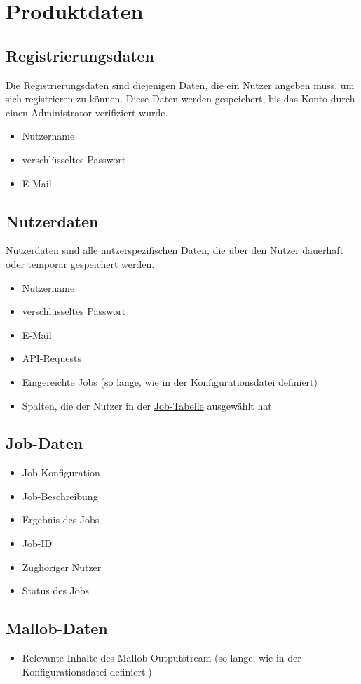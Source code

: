 \label{PD}
\section{Produktdaten}


\label{PD:Registrierungsdaten}
\subsection{Registrierungsdaten}
Die Registrierungsdaten sind diejenigen Daten, die ein Nutzer angeben muss, um sich registrieren zu können. Diese Daten werden gespeichert, bis das Konto durch einen Administrator verifiziert wurde.
\begin{itemize}[noitemsep]
    \item Nutzername
    \item verschlüsseltes Passwort
    \item E-Mail
\end{itemize}

\label{PD:Nutzerdaten}
\subsection{Nutzerdaten}
Nutzerdaten sind alle nutzerspezifischen Daten, die über den Nutzer dauerhaft oder temporär gespeichert werden.
\begin{itemize}[noitemsep]
    \item Nutzername
    \item verschlüsseltes Passwort
    \item E-Mail
    \item API-Requests %
    \item Eingereichte Jobs (so lange, wie in der Konfigurationsdatei definiert)
    \item Spalten, die der Nutzer in der \hyperref[pages:job-table]{Job-Tabelle} ausgewählt hat
\end{itemize}



\subsection{Job-Daten}
\begin{itemize}[noitemsep]
    \item Job-Konfiguration
    \item Job-Beschreibung
    \item Ergebnis des Jobs
    \item Job-ID
    \item Zughöriger Nutzer
    \item Status des Jobs
\end{itemize}

\subsection{Mallob-Daten}
\begin{itemize}
    \item Relevante Inhalte des Mallob-Outputstream (so lange, wie in der Konfigurationsdatei definiert.)
\end{itemize}
